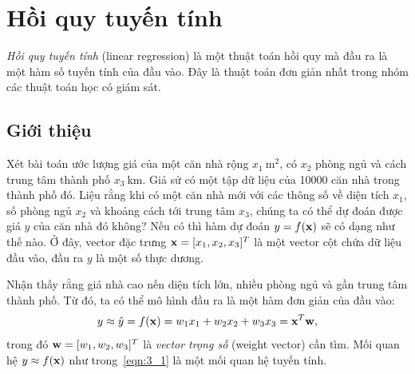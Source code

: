 \chapter{Hồi quy tuyến tính}
\label{cha:linear_regression}

\textit{Hồi quy tuyến tính} (linear regression) là một thuật toán hồi quy mà đầu ra là một hàm số tuyến tính của đầu vào. Đây là thuật toán đơn giản nhất trong nhóm các thuật toán học có giám sát.
\section{Giới thiệu}
Xét bài toán ước lượng giá của một căn nhà rộng $x_1 ~ \text{m}^2$, có $x_2$
phòng ngủ và cách trung tâm thành phố $x_3~ \text{km}$. Giả sử có một tập dữ liệu của 10000 căn nhà trong thành phố đó. Liệu rằng khi có một căn nhà
mới với các thông số về diện tích $x_1$, số phòng ngủ $x_2$ và khoảng cách tới
trung tâm $x_3$, chúng ta có thể dự đoán được giá $y$ của căn nhà đó không? Nếu
có thì hàm dự đoán $y = f(\mathbf{x})$ sẽ có dạng như thế nào. Ở đây, vector đặc
trưng $\mathbf{x} = [x_1, x_2, x_3]^T$ là một vector cột chứa dữ liệu đầu vào,
đầu ra $y$ là một số thực dương.

Nhận thấy rằng giá nhà cao nến diện tích lớn, nhiều phòng ngủ và gần trung tâm thành phố. Từ đó, ta có thể mô hình đầu ra là một hàm đơn giản của đầu vào:
\begin{equation}
\label{eqn:3_1}
y \approx \hat{y} = f(\mathbf{x}) = w_1 x_1 + w_2 x_2 + w_3 x_3 = \mathbf{x}^T\mathbf{w},
\end{equation}
trong đó $\mathbf{w} = [w_1, w_2, w_3]^T$ là \textit{vector trọng số} (weight vector) cần tìm. Mối quan hệ $y \approx f(\mathbf{x})$ như trong~\eqref{eqn:3_1} là một mối quan hệ tuyến tính.


